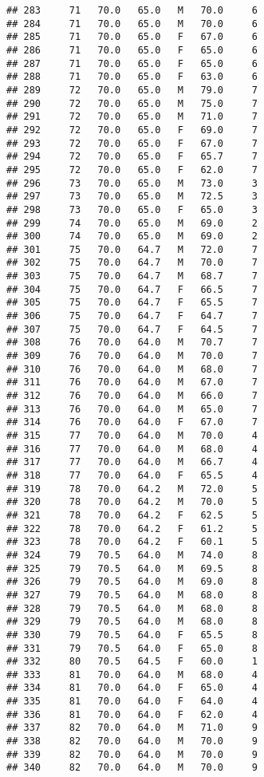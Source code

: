 \documentclass[
]{article}
\begin{document}
\begin{verbatim}
## 283     71   70.0   65.0   M   70.0     6
## 284     71   70.0   65.0   M   70.0     6
## 285     71   70.0   65.0   F   67.0     6
## 286     71   70.0   65.0   F   65.0     6
## 287     71   70.0   65.0   F   65.0     6
## 288     71   70.0   65.0   F   63.0     6
## 289     72   70.0   65.0   M   79.0     7
## 290     72   70.0   65.0   M   75.0     7
## 291     72   70.0   65.0   M   71.0     7
## 292     72   70.0   65.0   F   69.0     7
## 293     72   70.0   65.0   F   67.0     7
## 294     72   70.0   65.0   F   65.7     7
## 295     72   70.0   65.0   F   62.0     7
## 296     73   70.0   65.0   M   73.0     3
## 297     73   70.0   65.0   M   72.5     3
## 298     73   70.0   65.0   F   65.0     3
## 299     74   70.0   65.0   M   69.0     2
## 300     74   70.0   65.0   M   69.0     2
## 301     75   70.0   64.7   M   72.0     7
## 302     75   70.0   64.7   M   70.0     7
## 303     75   70.0   64.7   M   68.7     7
## 304     75   70.0   64.7   F   66.5     7
## 305     75   70.0   64.7   F   65.5     7
## 306     75   70.0   64.7   F   64.7     7
## 307     75   70.0   64.7   F   64.5     7
## 308     76   70.0   64.0   M   70.7     7
## 309     76   70.0   64.0   M   70.0     7
## 310     76   70.0   64.0   M   68.0     7
## 311     76   70.0   64.0   M   67.0     7
## 312     76   70.0   64.0   M   66.0     7
## 313     76   70.0   64.0   M   65.0     7
## 314     76   70.0   64.0   F   67.0     7
## 315     77   70.0   64.0   M   70.0     4
## 316     77   70.0   64.0   M   68.0     4
## 317     77   70.0   64.0   M   66.7     4
## 318     77   70.0   64.0   F   65.5     4
## 319     78   70.0   64.2   M   72.0     5
## 320     78   70.0   64.2   M   70.0     5
## 321     78   70.0   64.2   F   62.5     5
## 322     78   70.0   64.2   F   61.2     5
## 323     78   70.0   64.2   F   60.1     5
## 324     79   70.5   64.0   M   74.0     8
## 325     79   70.5   64.0   M   69.5     8
## 326     79   70.5   64.0   M   69.0     8
## 327     79   70.5   64.0   M   68.0     8
## 328     79   70.5   64.0   M   68.0     8
## 329     79   70.5   64.0   M   68.0     8
## 330     79   70.5   64.0   F   65.5     8
## 331     79   70.5   64.0   F   65.0     8
## 332     80   70.5   64.5   F   60.0     1
## 333     81   70.0   64.0   M   68.0     4
## 334     81   70.0   64.0   F   65.0     4
## 335     81   70.0   64.0   F   64.0     4
## 336     81   70.0   64.0   F   62.0     4
## 337     82   70.0   64.0   M   71.0     9
## 338     82   70.0   64.0   M   70.0     9
## 339     82   70.0   64.0   M   70.0     9
## 340     82   70.0   64.0   M   70.0     9

\end{verbatim}
\end{document}
